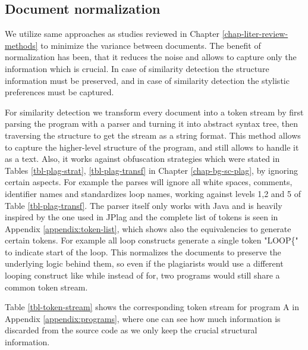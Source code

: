 \subsection{Document normalization}

We utilize same approaches as studies reviewed in Chapter \ref{chap-liter-review-methods} to minimize the variance between documents. The benefit of normalization has been, that it reduces the noise and allows to capture only the information which is crucial. In case of similarity detection the structure information must be preserved, and in case of similarity detection the stylistic preferences must be captured.

For similarity detection we transform every document into a token stream by first parsing the program with a parser and turning it into abstract syntax tree, then traversing the structure to get the stream as a string format. This method allows to capture the higher-level structure of the program, and still allows to handle it as a text. Also, it works against obfuscation strategies which were stated in Tables \ref{tbl-plag-strat}, \ref{tbl-plag-transf} in Chapter \ref{chap-bg-sc-plag}, by ignoring certain aspects. For example the parses will ignore all white spaces, comments, identifier names and standardizes loop names, working against levels 1,2 and 5 of Table \ref{tbl-plag-transf}. The parser itself only works with Java and is heavily inspired by the one used in JPlag \cite{prechelt2002finding} and the complete list of tokens is seen in Appendix \ref{appendix:token-list}, which shows also the equivalencies to generate certain tokens. For example all loop constructs generate a single token "LOOP\{" to indicate start of the loop. This normalizes the documents to preserve the underlying logic behind them, so even if the plagiarists would use a different looping construct like while instead of for, two programs would still share a common token stream. 

Table \ref{tbl-token-stream} shows the corresponding token stream for program A in Appendix \ref{appendix:programs}, where one can see how much information is discarded from the source code as we only keep the crucial structural information.

\clearpage

